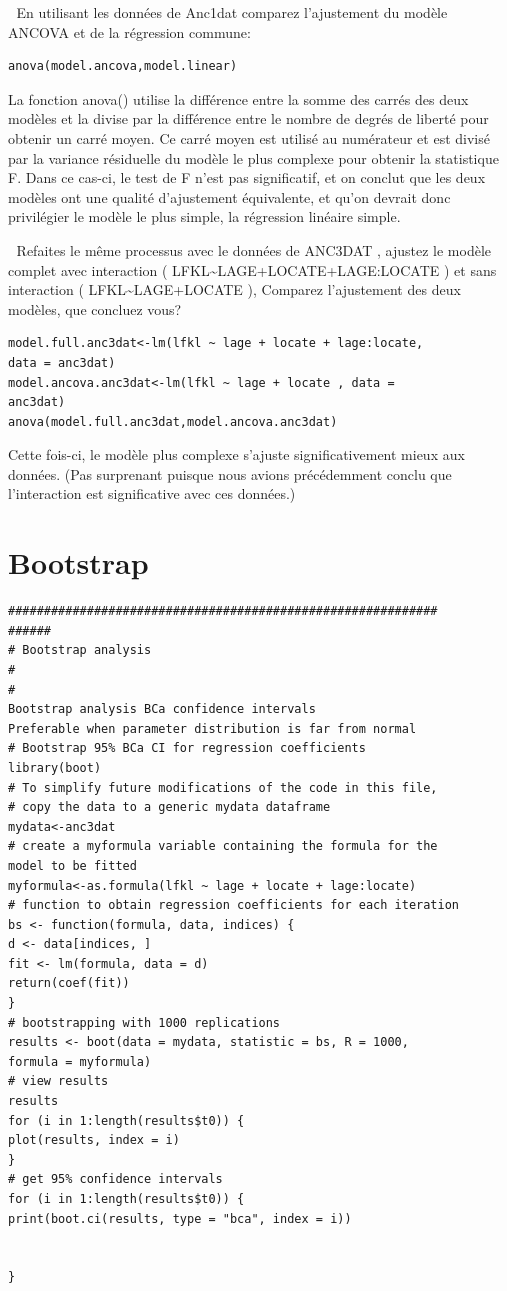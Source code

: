 \documentclass[12pt,]{book}
\begin{document}
 En utilisant les données de Anc1dat comparez l'ajustement du modèle
ANCOVA et de la régression commune:

\begin{verbatim}
anova(model.ancova,model.linear)
\end{verbatim}

La fonction anova() utilise la différence entre la somme des carrés des
deux modèles et la divise par la différence entre le nombre de degrés
de liberté pour obtenir un carré moyen. Ce carré moyen est utilisé au
numérateur et est divisé par la variance résiduelle du modèle le plus
complexe pour obtenir la statistique F. Dans ce cas-ci, le test de F n'est
pas significatif, et on conclut que les deux modèles ont une qualité
d'ajustement équivalente, et qu'on devrait donc privilégier le modèle le
plus simple, la régression linéaire simple.

 Refaites le même processus avec le données de ANC3DAT , ajustez le
modèle complet avec interaction ( LFKL\textasciitilde{}LAGE+LOCATE+LAGE:LOCATE ) et
sans interaction ( LFKL\textasciitilde{}LAGE+LOCATE ), Comparez l'ajustement des deux
modèles, que concluez vous?

\begin{verbatim}
model.full.anc3dat<-lm(lfkl ~ lage + locate + lage:locate,
data = anc3dat)
model.ancova.anc3dat<-lm(lfkl ~ lage + locate , data =
anc3dat)
anova(model.full.anc3dat,model.ancova.anc3dat)
\end{verbatim}

Cette fois-ci, le modèle plus complexe s'ajuste significativement mieux
aux données. (Pas surprenant puisque nous avions précédemment
conclu que l'interaction est significative avec ces données.)

\hypertarget{bootstrap}{%
\section{Bootstrap}\label{bootstrap}}

\begin{verbatim}
############################################################
######
# Bootstrap analysis
#
#
Bootstrap analysis BCa confidence intervals
Preferable when parameter distribution is far from normal
# Bootstrap 95% BCa CI for regression coefficients
library(boot)
# To simplify future modifications of the code in this file,
# copy the data to a generic mydata dataframe
mydata<-anc3dat
# create a myformula variable containing the formula for the
model to be fitted
myformula<-as.formula(lfkl ~ lage + locate + lage:locate)
# function to obtain regression coefficients for each iteration
bs <- function(formula, data, indices) {
d <- data[indices, ]
fit <- lm(formula, data = d)
return(coef(fit))
}
# bootstrapping with 1000 replications
results <- boot(data = mydata, statistic = bs, R = 1000,
formula = myformula)
# view results
results
for (i in 1:length(results$t0)) {
plot(results, index = i)
}
# get 95% confidence intervals
for (i in 1:length(results$t0)) {
print(boot.ci(results, type = "bca", index = i))


}
\end{verbatim}
\end{document}
